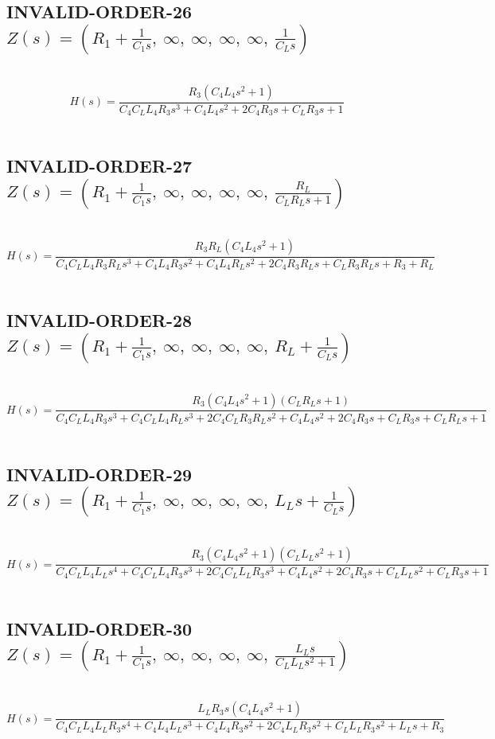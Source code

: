 \documentclass{article}
\begin{document}
\subsection{INVALID-ORDER-26 $Z(s) = \left( R_{1} + \frac{1}{C_{1} s}, \  \infty, \  \infty, \  \infty, \  \infty, \  \frac{1}{C_{L} s}\right)$ } \ 
\textbf{\[H(s) = \frac{R_{3} \left(C_{4} L_{4} s^{2} + 1\right)}{C_{4} C_{L} L_{4} R_{3} s^{3} + C_{4} L_{4} s^{2} + 2 C_{4} R_{3} s + C_{L} R_{3} s + 1}\] } \ 
\subsection{INVALID-ORDER-27 $Z(s) = \left( R_{1} + \frac{1}{C_{1} s}, \  \infty, \  \infty, \  \infty, \  \infty, \  \frac{R_{L}}{C_{L} R_{L} s + 1}\right)$ } \ 
\textbf{\[H(s) = \frac{R_{3} R_{L} \left(C_{4} L_{4} s^{2} + 1\right)}{C_{4} C_{L} L_{4} R_{3} R_{L} s^{3} + C_{4} L_{4} R_{3} s^{2} + C_{4} L_{4} R_{L} s^{2} + 2 C_{4} R_{3} R_{L} s + C_{L} R_{3} R_{L} s + R_{3} + R_{L}}\] } \ 
\subsection{INVALID-ORDER-28 $Z(s) = \left( R_{1} + \frac{1}{C_{1} s}, \  \infty, \  \infty, \  \infty, \  \infty, \  R_{L} + \frac{1}{C_{L} s}\right)$ } \ 
\textbf{\[H(s) = \frac{R_{3} \left(C_{4} L_{4} s^{2} + 1\right) \left(C_{L} R_{L} s + 1\right)}{C_{4} C_{L} L_{4} R_{3} s^{3} + C_{4} C_{L} L_{4} R_{L} s^{3} + 2 C_{4} C_{L} R_{3} R_{L} s^{2} + C_{4} L_{4} s^{2} + 2 C_{4} R_{3} s + C_{L} R_{3} s + C_{L} R_{L} s + 1}\] } \ 
\subsection{INVALID-ORDER-29 $Z(s) = \left( R_{1} + \frac{1}{C_{1} s}, \  \infty, \  \infty, \  \infty, \  \infty, \  L_{L} s + \frac{1}{C_{L} s}\right)$ } \ 
\textbf{\[H(s) = \frac{R_{3} \left(C_{4} L_{4} s^{2} + 1\right) \left(C_{L} L_{L} s^{2} + 1\right)}{C_{4} C_{L} L_{4} L_{L} s^{4} + C_{4} C_{L} L_{4} R_{3} s^{3} + 2 C_{4} C_{L} L_{L} R_{3} s^{3} + C_{4} L_{4} s^{2} + 2 C_{4} R_{3} s + C_{L} L_{L} s^{2} + C_{L} R_{3} s + 1}\] } \ 
\subsection{INVALID-ORDER-30 $Z(s) = \left( R_{1} + \frac{1}{C_{1} s}, \  \infty, \  \infty, \  \infty, \  \infty, \  \frac{L_{L} s}{C_{L} L_{L} s^{2} + 1}\right)$ } \ 
\textbf{\[H(s) = \frac{L_{L} R_{3} s \left(C_{4} L_{4} s^{2} + 1\right)}{C_{4} C_{L} L_{4} L_{L} R_{3} s^{4} + C_{4} L_{4} L_{L} s^{3} + C_{4} L_{4} R_{3} s^{2} + 2 C_{4} L_{L} R_{3} s^{2} + C_{L} L_{L} R_{3} s^{2} + L_{L} s + R_{3}}\] } \ 
\end{document}
